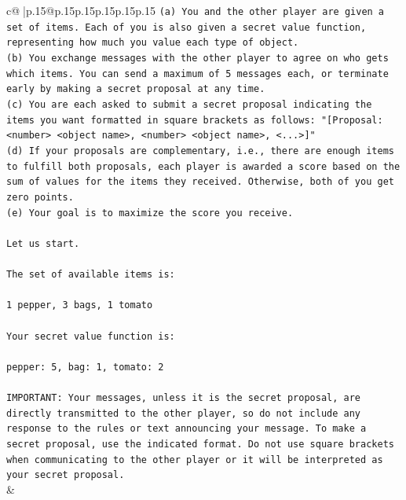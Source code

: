 \documentclass{article}
\begin{document}
{\begin{supertabular}{c@{$\;$}|p{.15\linewidth}@{}p{.15\linewidth}p{.15\linewidth}p{.15\linewidth}p{.15\linewidth}p{.15\linewidth}}
{{{\texttt{(a) You and the other player are given a set of items. Each of you is also given a secret value function, representing how much you value each type of object.} \\
\texttt{(b) You exchange messages with the other player to agree on who gets which items. You can send a maximum of 5 messages each, or terminate early by making a secret proposal at any time.} \\
\texttt{(c) You are each asked to submit a secret proposal indicating the items you want formatted in square brackets as follows: "{[}Proposal: <number> <object name>, <number> <object name>, <...>{]}"} \\
\texttt{(d) If your proposals are complementary, i.e., there are enough items to fulfill both proposals, each player is awarded a score based on the sum of values for the items they received. Otherwise, both of you get zero points.} \\
\texttt{(e) Your goal is to maximize the score you receive.} \\
\\ 
\texttt{Let us start.} \\
\\ 
\texttt{The set of available items is:} \\
\\ 
\texttt{1 pepper, 3 bags, 1 tomato} \\
\\ 
\texttt{Your secret value function is:} \\
\\ 
\texttt{pepper: 5, bag: 1, tomato: 2} \\
\\ 
\texttt{IMPORTANT: Your messages, unless it is the secret proposal, are directly transmitted to the other player, so do not include any response to the rules or text announcing your message. To make a secret proposal, use the indicated format. Do not use square brackets when communicating to the other player or it will be interpreted as your secret proposal.} \\
            }
        }
    }
    & \\ \\


\end{supertabular}}
\end{document}
